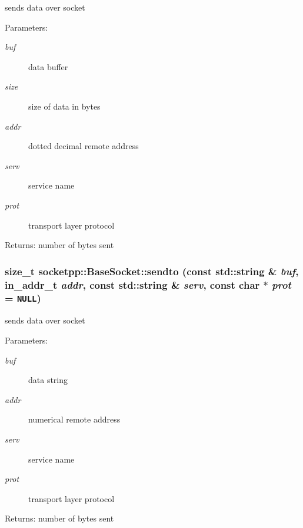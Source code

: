 \begin{CompactItemize}
sends data over socket 

\begin{Desc}
\item[Parameters:]
\begin{description}
\item[{\em buf}]data buffer \item[{\em size}]size of data in bytes \item[{\em addr}]dotted decimal remote address \item[{\em serv}]service name \item[{\em prot}]transport layer protocol \end{description}
\end{Desc}
\begin{Desc}
\item[Returns:]number of bytes sent \end{Desc}
\hypertarget{classsocketpp_1_1BaseSocket_4afc9ac34b702af852f2b52e68a90c3e}{
\subsubsection[{sendto}]{\setlength{\rightskip}{0pt plus 5cm}size\_\-t socketpp::BaseSocket::sendto (const std::string \& {\em buf}, \/  in\_\-addr\_\-t {\em addr}, \/  const std::string \& {\em serv}, \/  const char $\ast$ {\em prot} = {\tt NULL})}}
\label{classsocketpp_1_1BaseSocket_4afc9ac34b702af852f2b52e68a90c3e}


sends data over socket 

\begin{Desc}
\item[Parameters:]
\begin{description}
\item[{\em buf}]data string \item[{\em addr}]numerical remote address \item[{\em serv}]service name \item[{\em prot}]transport layer protocol \end{description}
\end{Desc}
\begin{Desc}
\item[Returns:]number of bytes sent \end{Desc}
\hypertarget{classsocketpp_1_1BaseSocket_0154d562be27c8b2aa074d5f6bb8ab03}{
}
\end{CompactItemize}
